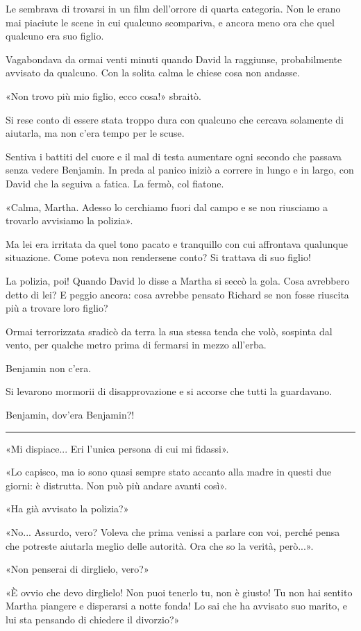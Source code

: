 \documentclass[a4paper,10pt]{memoir}
\begin{document}
Le sembrava di trovarsi in un film dell'orrore di quarta categoria. Non le erano mai piaciute le scene in cui qualcuno
scompariva, e ancora meno ora che quel qualcuno era suo figlio.

Vagabondava da ormai venti minuti quando David la raggiunse, probabilmente avvisato da qualcuno. Con la solita calma le
chiese cosa non andasse.

«Non trovo più mio figlio, ecco cosa!» sbraitò.

Si rese conto di essere stata troppo dura con qualcuno che cercava solamente di aiutarla, ma non c'era tempo per le
scuse.

Sentiva i battiti del cuore e il mal di testa aumentare ogni secondo che passava senza vedere Benjamin. In preda al
panico iniziò a correre in lungo e in largo, con David che la seguiva a fatica. La fermò, col fiatone.

«Calma, Martha. Adesso lo cerchiamo fuori dal campo e se non riusciamo a trovarlo avvisiamo la polizia».

Ma lei era irritata da quel tono pacato e tranquillo con cui affrontava qualunque situazione. Come poteva non rendersene
conto? Si trattava di suo figlio!

La polizia, poi! Quando David lo disse a Martha si seccò la gola. Cosa avrebbero detto di lei? E peggio ancora: cosa
avrebbe pensato Richard se non fosse riuscita più a trovare loro figlio?

Ormai terrorizzata sradicò da terra la sua stessa tenda che volò, sospinta dal vento, per qualche metro prima di
fermarsi in mezzo all'erba.

Benjamin non c'era.

Si levarono mormorii di disapprovazione e si accorse che tutti la guardavano.

Benjamin, dov'era Benjamin?!

\plainbreak{1}

«Mi dispiace... Eri l'unica persona di cui mi fidassi».

«Lo capisco, ma io sono quasi sempre stato accanto alla madre in questi due giorni: è distrutta. Non può più andare
avanti così».

«Ha già avvisato la polizia?»

«No... Assurdo, vero? Voleva che prima venissi a parlare con voi, perché pensa che potreste aiutarla meglio delle
autorità. Ora che so la verità, però...».

«Non penserai di dirglielo, vero?»

«È ovvio che devo dirglielo! Non puoi tenerlo tu, non è giusto! Tu non hai sentito Martha piangere e disperarsi a notte
fonda! Lo sai che ha avvisato suo marito, e lui sta pensando di chiedere il divorzio?»
\end{document}
